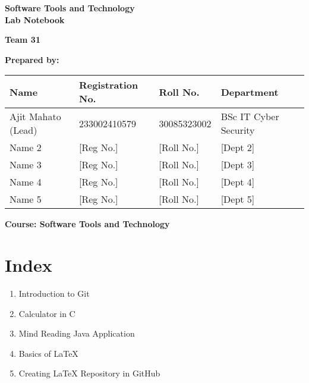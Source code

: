 \begin{titlepage}
    \centering
    \vspace*{2cm}
    
    {\Huge\bfseries Software Tools and Technology \\[0.4cm] Lab Notebook \\[2cm]}
    
    {\Large\textbf{Team 31}\\[1.5cm]}
    
    \vspace{0.5cm}
    \textbf{Prepared by:}\\[0.5cm]
    
    \vspace{1cm}
    \begin{tabular}{|l|l|l|l|}
    \hline
    \textbf{Name} & \textbf{Registration No.} & \textbf{Roll No.} & \textbf{Department} \\
    \hline
     Ajit Mahato (Lead)& 233002410579& 30085323002& BSc IT Cyber Security\\
    Name 2 & [Reg No.] & [Roll No.] & [Dept 2] \\
    Name 3 & [Reg No.] & [Roll No.] & [Dept 3] \\
    Name 4 & [Reg No.] & [Roll No.] & [Dept 4] \\
    Name 5 & [Reg No.] & [Roll No.] & [Dept 5] \\
    \hline
    \end{tabular}
    
    \vspace{2cm}
    
    \vfill
    \textbf{Course: Software Tools and Technology}
    
\end{titlepage}

\newpage
\chapter*{Index}
\thispagestyle{empty} %

\begin{enumerate}
    \item Introduction to Git
    \item Calculator in C\dotfill 
    \item Mind Reading Java Application\dotfill 
    \item Basics of LaTeX\dotfill 
    \item Creating LaTeX Repository in GitHub\dotfill 
\end{enumerate}
